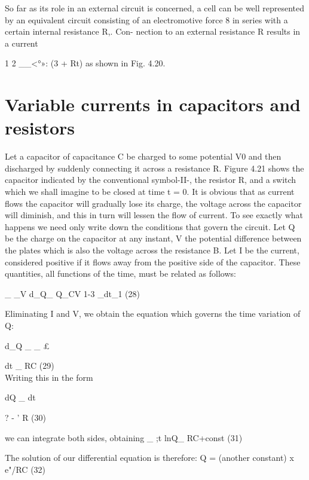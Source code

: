 So far as its role in an external circuit is concerned, a cell can be
well represented by an equivalent circuit consisting of an electromotive
force 8 in series with a certain internal resistance R,. Con-
nection to an external resistance R results in a current

1 2 __<°»:
(3 + Rt)
as shown in Fig. 4.20.

\section{Variable currents in capacitors and resistors}

Let a capacitor of capacitance C be charged to some potential V0
and then discharged by suddenly connecting it across a resistance R.
Figure 4.21 shows the capacitor indicated by the conventional
symbol-II-, the resistor R, and a switch which we shall imagine to
be closed at time t = 0. It is obvious that as current flows the
capacitor will gradually lose its charge, the voltage across the capacitor
will diminish, and this in turn will lessen the flow of current. To
see exactly what happens we need only write down the conditions
that govern the circuit. Let Q be the charge on the capacitor at any
instant, V the potential difference between the plates which is also
the voltage across the resistance B. Let I be the current, considered
positive if it flows away from the positive side of the capacitor. These
quantities, all functions of the time, must be related as follows:

_ _V d_Q_
Q_CV 1-3 _dt_1 (28)
\begin{equation}
\end{equation}

Eliminating I and V, we obtain the equation which governs the time
variation of Q:

d_Q _ _ £

dt _ RC (29)
\begin{equation}
\end{equation}
Writing this in the form

dQ _ dt

? - ' R (30)
\begin{equation}
\end{equation}

we can integrate both sides, obtaining
_ ;t
lnQ_ RC+const (31)
\begin{equation}
\end{equation}

The solution of our differential equation is therefore:
Q = (another constant) x e"/RC (32)
\begin{equation}
\end{equation}

